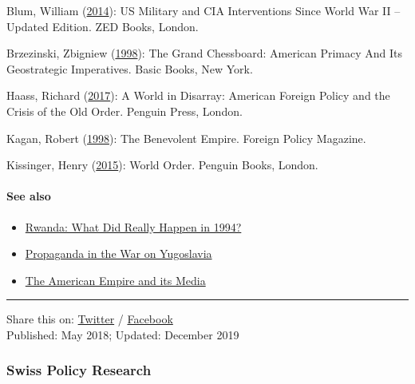 Blum, William
(\href{https://www.zedbooks.net/shop/book/killing-hope/}{2014}): US
Military and CIA Interventions Since World War II -- Updated Edition.
ZED Books, London.

Brzezinski, Zbigniew
(\href{https://archive.org/details/TheGrandChessboardAmericanPrimacyAndItsGeostrategicImperatives1997ZbigniewBrzezinski}{1998}):
The Grand Chessboard: American Primacy And Its Geostrategic Imperatives.
Basic Books, New York.

Haass, Richard (\href{https://www.cfr.org/book/world-disarray}{2017}): A
World in Disarray: American Foreign Policy and the Crisis of the Old
Order. Penguin Press, London.

Kagan, Robert
(\href{http://carnegieendowment.org/1998/06/01/benevolent-empire-pub-275}{1998}):
The Benevolent Empire. Foreign Policy Magazine.

Kissinger, Henry
(\href{https://www.penguinrandomhouse.com/books/316669/world-order-by-henry-kissinger/9780143127710}{2015}):
World Order. Penguin Books, London.

\hypertarget{see-also}{%
\paragraph{See also}\label{see-also}}

\begin{itemize}
\tightlist
\item
  \href{https://swprs.org/rwanda-what-did-really-happen-in-1994/}{Rwanda:
  What Did Really Happen in 1994?}
\item
  \href{https://swprs.org/propaganda-in-the-war-on-yugoslavia/}{Propaganda
  in the War on Yugoslavia}
\item
  \href{https://swprs.org/the-american-empire-and-its-media/}{The
  American Empire and its Media}
\end{itemize}

\begin{center}\rule{0.5\linewidth}{\linethickness}\end{center}

Share this on:
\href{https://twitter.com/intent/tweet?url=https://swprs.org/us-foreign-policy/}{Twitter}
/
\href{https://www.facebook.com/share.php?u=https://swprs.org/us-foreign-policy/}{Facebook}\\
Published: May 2018; Updated: December 2019

\hypertarget{swiss-policy-research}{%
\subsubsection{Swiss Policy Research}\label{swiss-policy-research}}

